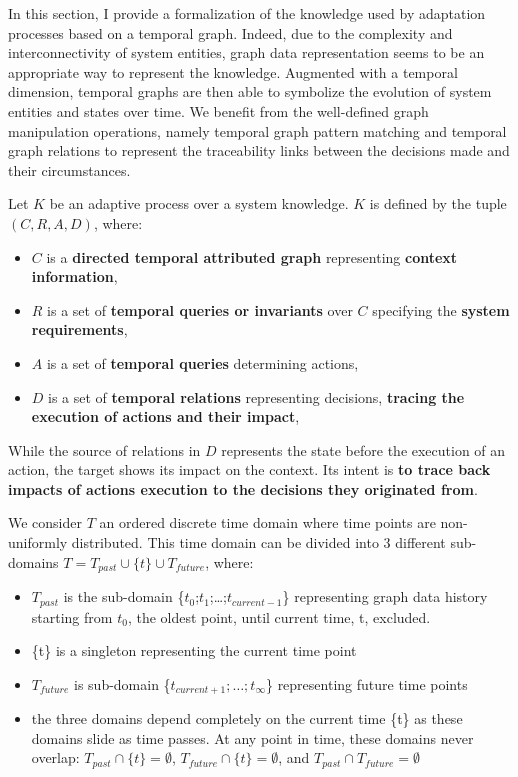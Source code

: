 In this section, I provide a formalization of the \gls{knowledge} used by adaptation processes based on a temporal graph. 
Indeed, due to the complexity and interconnectivity of system entities, graph data representation seems to be an appropriate way to represent the \gls{knowledge}. 
Augmented with a temporal dimension, temporal graphs are then able to symbolize the evolution of system entities and states over time. 
We benefit from the well-defined graph manipulation operations, namely temporal graph pattern matching and temporal graph relations to represent the traceability links between the \glspl{decision} made and their \glspl{circumstance}.

Let $K$ be an adaptive process over a system \gls{knowledge}. 
$K$ is defined by the tuple \textbf{$(C, R, A, D)$}, where:
\begin{itemize}
	\vspace{-0.5em}
	\setlength\itemsep{-0.3em}
	\item $C$ is a \textbf{directed temporal attributed graph} representing \textbf{\gls{context} information},
	\item $R$ is a set of \textbf{temporal queries or invariants} over $C$ specifying the \textbf{system \glspl{requirement}},
	\item $A$ is a set of \textbf{temporal queries} determining \glspl{action},
	\item $D$ is a set of \textbf{temporal relations} representing \glspl{decision}, \ie \textbf{tracing the execution of actions and their impact},
\end{itemize}

While the source of relations in $D$ represents the state before the execution of an action, the target shows its impact on the \gls{context}. 
Its intent is \textbf{to trace back impacts of actions execution to the decisions they originated from}.    

We consider $T$ an ordered discrete time domain where time points are non-uniformly distributed. This time domain can be divided into 3 different sub-domains $T = T_{past} \cup \{t\} \cup T_{future}$, where:  
\begin{itemize}
\item $T_{past}$ is the sub-domain \{$t_{0}$;$t_{1}$;\ldots;$t_{current-1}$\}  representing graph data history starting from $t_0$, the oldest point, until current time, t, excluded.
\item \{t\} is a singleton representing the current time 
point
\item $T_{future}$ is sub-domain \{$t_{current+1};\ldots;t_{\infty}$\} representing future time points 
\item the three domains depend completely on the current time \{t\} as these domains slide as time passes. At any point in time, these domains never overlap: $T_{past} \cap \{t\} = \emptyset$, $T_{future} \cap \{t\} =  \emptyset$, and $T_{past} \cap T_{future} = \emptyset$
\end{itemize} 

